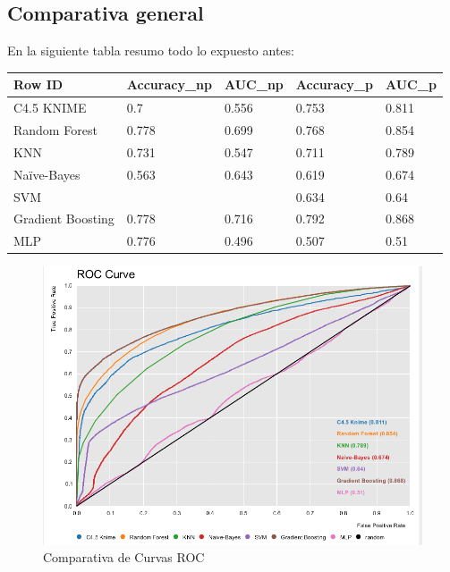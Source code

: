 \subsection{Comparativa general}

En la siguiente tabla resumo todo lo expuesto antes:

\begin{table}[H]
	\centering
	\begin{tabular}{|l|l|l|l|l|}
		\hline
		Row ID            & Accuracy\_np & AUC\_np & Accuracy\_p & AUC\_p   \\ \hline
		C4.5 KNIME        & 0.7         & 0.556  & 0.753    & 0.811 \\ \hline
		Random Forest     & 0.778       & 0.699  & 0.768    & 0.854 \\ \hline
		KNN               & 0.731       & 0.547  & 0.711    & 0.789 \\ \hline
		Naïve-Bayes       & 0.563       & 0.643  & 0.619    & 0.674 \\ \hline
		SVM               &             &        & 0.634    & 0.64  \\ \hline
		Gradient Boosting & 0.778       & 0.716  & 0.792    & 0.868 \\ \hline
		MLP               & 0.776       & 0.496  & 0.507    & 0.51  \\ \hline
	\end{tabular}
\end{table}

\begin{figure}[H] %
	\centering
	\includegraphics[scale=0.4453]{roc-global.png}  %
	\caption{Comparativa de Curvas ROC} 
	\label{fig:rocglobal}
\end{figure}

